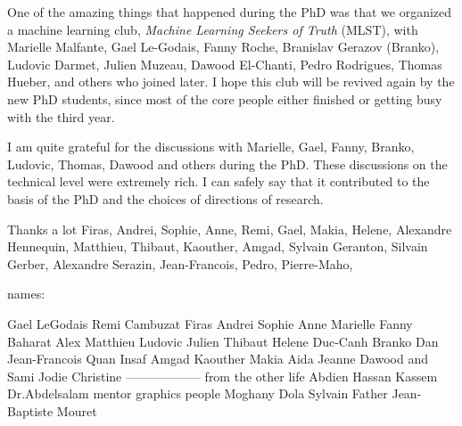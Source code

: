 \par One of the amazing things that happened during the PhD was that we organized a machine learning club, \textit{Machine Learning Seekers of Truth} (MLST), with Marielle Malfante, Gael Le-Godais, Fanny Roche, Branislav Gerazov (Branko), Ludovic Darmet, Julien Muzeau, Dawood El-Chanti, Pedro Rodrigues, Thomas Hueber, and others who joined later. I hope this club will be revived again by the new PhD students, since most of the core people either finished or getting busy with the third year.

\par I am quite grateful for the discussions with Marielle, Gael, Fanny, Branko, Ludovic, Thomas, Dawood and others during the PhD. These discussions on the technical level were extremely rich. I can safely say that it contributed to the basis of the PhD and the choices of directions of research.

\par Thanks a lot Firas, Andrei, Sophie, Anne, Remi, Gael, Makia, Helene, Alexandre Hennequin, Matthieu, Thibaut, Kaouther, Amgad, Sylvain Geranton, Silvain Gerber, Alexandre Serazin, Jean-Francois, Pedro, Pierre-Maho,

names:

Gael LeGodais
Remi Cambuzat
Firas
Andrei
Sophie
Anne
Marielle
Fanny
Baharat
Alex
Matthieu
Ludovic
Julien
Thibaut
Helene
Duc-Canh
Branko
Dan
Jean-Francois
Quan
Insaf
Amgad
Kaouther
Makia
Aida
Jeanne
Dawood and Sami
Jodie
Christine
------------------
from the other life
Abdien
Hassan
Kassem
Dr.Abdelsalam
mentor graphics people
Moghany
Dola
Sylvain
Father
Jean-Baptiste Mouret
